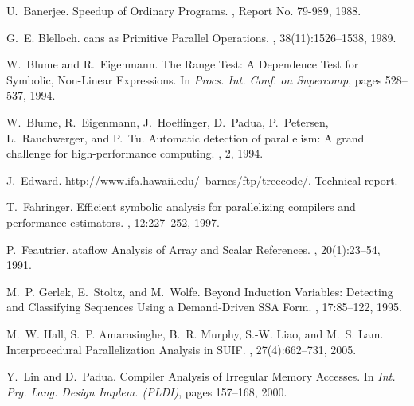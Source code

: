 \documentclass[10pt,nocopyrightspace]{sigplanconf}
\begin{document}
\begin{thebibliography}{}
\softraggedright

U.~Banerjee.
\newblock Speedup of {O}rdinary {P}rograms.
, Report No. 79-989, 1988.

G.~E. Blelloch.
cans as {P}rimitive {P}arallel {O}perations.
, 38(11):1526--1538, 1989.

W.~Blume and R.~Eigenmann.
\newblock The {R}ange {T}est: {A} {D}ependence {T}est for {S}ymbolic,
  {N}on-{L}inear {E}xpressions.
\newblock In {\em Procs. Int. Conf. on Supercomp}, pages 528--537, 1994.

W.~Blume, R.~Eigenmann, J.~Hoeflinger, D.~Padua, P.~Petersen, L.~Rauchwerger,
  and P.~Tu.
\newblock Automatic detection of parallelism: A grand challenge for
  high-performance computing.
, 2, 1994.

J.~Edward.
\newblock http://www.ifa.hawaii.edu/~barnes/ftp/treecode/.
\newblock Technical report.

T.~Fahringer.
\newblock Efficient symbolic analysis for parallelizing compilers and
  performance estimators.
, 12:227--252, 1997.

P.~Feautrier.
ataflow {A}nalysis of {A}rray and {S}calar {R}eferences.
, 20(1):23--54, 1991.

M.~P. Gerlek, E.~Stoltz, and M.~Wolfe.
\newblock Beyond {I}nduction {V}ariables: {D}etecting and {C}lassifying
  {S}equences {U}sing a {D}emand-{D}riven {SSA} {F}orm.
,
  17:85--122, 1995.

M.~W. Hall, S.~P. Amarasinghe, B.~R. Murphy, S.-W. Liao, and M.~S. Lam.
\newblock Interprocedural {P}arallelization {A}nalysis in {SUIF}.
,
  27(4):662--731, 2005.

Y.~Lin and D.~Padua.
\newblock Compiler {A}nalysis of {I}rregular {M}emory {A}ccesses.
\newblock In {\em Int. Prg. Lang. Design Implem. (PLDI)}, pages 157--168, 2000.


\end{thebibliography}
\end{document}
